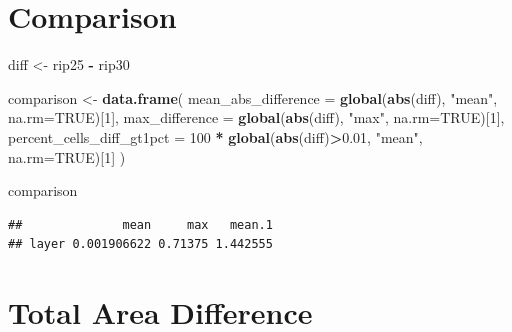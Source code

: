 \documentclass[
]{article}
\newenvironment{Shaded}{\begin{snugshade}}{\end{snugshade}}
\newcommand{\AttributeTok}[1]{\textcolor[rgb]{0.13,0.29,0.53}{#1}}
\newcommand{\ConstantTok}[1]{\textcolor[rgb]{0.56,0.35,0.01}{#1}}
\newcommand{\DecValTok}[1]{\textcolor[rgb]{0.00,0.00,0.81}{#1}}
\newcommand{\FloatTok}[1]{\textcolor[rgb]{0.00,0.00,0.81}{#1}}
\newcommand{\FunctionTok}[1]{\textcolor[rgb]{0.13,0.29,0.53}{\textbf{#1}}}
\newcommand{\NormalTok}[1]{#1}
\newcommand{\OtherTok}[1]{\textcolor[rgb]{0.56,0.35,0.01}{#1}}
\newcommand{\SpecialCharTok}[1]{\textcolor[rgb]{0.81,0.36,0.00}{\textbf{#1}}}
\newcommand{\StringTok}[1]{\textcolor[rgb]{0.31,0.60,0.02}{#1}}
\begin{document}
\section{Comparison}\label{comparison}

\begin{Shaded}
\begin{Highlighting}[]
\NormalTok{diff }\OtherTok{\textless{}{-}}\NormalTok{ rip25 }\SpecialCharTok{{-}}\NormalTok{ rip30}

\NormalTok{comparison }\OtherTok{\textless{}{-}} \FunctionTok{data.frame}\NormalTok{(}
  \AttributeTok{mean\_abs\_difference =} \FunctionTok{global}\NormalTok{(}\FunctionTok{abs}\NormalTok{(diff), }\StringTok{"mean"}\NormalTok{, }\AttributeTok{na.rm=}\ConstantTok{TRUE}\NormalTok{)[}\DecValTok{1}\NormalTok{],}
  \AttributeTok{max\_difference =} \FunctionTok{global}\NormalTok{(}\FunctionTok{abs}\NormalTok{(diff), }\StringTok{"max"}\NormalTok{, }\AttributeTok{na.rm=}\ConstantTok{TRUE}\NormalTok{)[}\DecValTok{1}\NormalTok{],}
  \AttributeTok{percent\_cells\_diff\_gt1pct =} \DecValTok{100} \SpecialCharTok{*} \FunctionTok{global}\NormalTok{(}\FunctionTok{abs}\NormalTok{(diff)}\SpecialCharTok{\textgreater{}}\FloatTok{0.01}\NormalTok{, }\StringTok{"mean"}\NormalTok{, }\AttributeTok{na.rm=}\ConstantTok{TRUE}\NormalTok{)[}\DecValTok{1}\NormalTok{]}
\NormalTok{)}

\NormalTok{comparison}
\end{Highlighting}
\end{Shaded}

\begin{verbatim}
##              mean     max   mean.1
## layer 0.001906622 0.71375 1.442555
\end{verbatim}

\section{Total Area Difference}\label{total-area-difference}
\end{document}
